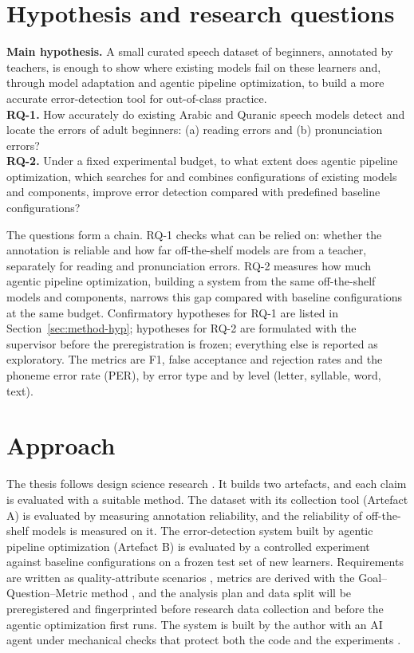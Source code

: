 \section{Hypothesis and research questions}\label{sec:rq}

\begin{rqbox}
\textbf{Main hypothesis.} A small curated speech dataset of beginners, annotated by teachers, is enough to show where existing models fail on these learners and, through model adaptation and agentic pipeline optimization, to build a more accurate error-detection tool for out-of-class practice.\\[6pt]
\textbf{RQ-1.} How accurately do existing Arabic and Quranic speech models detect and locate the errors of adult beginners: (a) reading errors and (b) pronunciation errors?\\[4pt]
\textbf{RQ-2.} Under a fixed experimental budget, to what extent does agentic pipeline optimization, which searches for and combines configurations of existing models and components, improve error detection compared with predefined baseline configurations?
\end{rqbox}

The questions form a chain. RQ-1 checks what can be relied on: whether the annotation is reliable and how far
off-the-shelf models are from a teacher, separately for reading and pronunciation errors. RQ-2 measures how much
agentic pipeline optimization, building a system from the same off-the-shelf models and components, narrows this
gap compared with baseline configurations at the same budget. Confirmatory hypotheses for RQ-1 are listed in
Section~\ref{sec:method-hyp}; hypotheses for RQ-2 are formulated with the supervisor before the preregistration
is frozen; everything else is reported as exploratory. The metrics are F1, false acceptance and rejection rates
and the phoneme error rate (PER), by error type and by level (letter, syllable, word, text).

\section{Approach}

The thesis follows design science research \cite{SRC-100,SRC-101}. It builds two artefacts, and each claim is
evaluated with a suitable method. The dataset with its collection tool (Artefact A) is evaluated by measuring
annotation reliability, and the reliability of off-the-shelf models is measured on it. The error-detection
system built by agentic pipeline optimization (Artefact B) is evaluated by a controlled experiment against
baseline configurations on a frozen test set of new learners.
Requirements are written as quality-attribute scenarios \cite{SRC-047}, metrics are derived with the
Goal--Question--Metric method \cite{SRC-048}, and the analysis plan and data split will be preregistered and
fingerprinted before research data collection and before the agentic optimization first runs. The system is built by
the author with an AI agent under mechanical checks that protect both the code and the experiments
\cite{SRC-067}.

